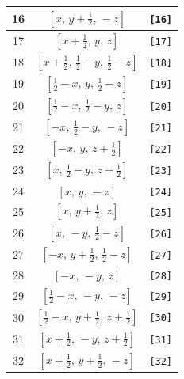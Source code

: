 \documentclass[fleqn,8pt]{jsarticle}
\begin{document}
\begin{longtable}{ccc}
16 & $\left[ x,\, y + \frac{1}{2},\, - z \right]$ & {\tt [16]} \\ \hline
17 & $\left[ x + \frac{1}{2},\, y,\, z \right]$ & {\tt [17]} \\ \hline
18 & $\left[ x + \frac{1}{2},\, \frac{1}{2} - y,\, \frac{1}{2} - z \right]$ & {\tt [18]} \\ \hline
19 & $\left[ \frac{1}{2} - x,\, y,\, \frac{1}{2} - z \right]$ & {\tt [19]} \\ \hline
20 & $\left[ \frac{1}{2} - x,\, \frac{1}{2} - y,\, z \right]$ & {\tt [20]} \\ \hline
21 & $\left[ - x,\, \frac{1}{2} - y,\, - z \right]$ & {\tt [21]} \\ \hline
22 & $\left[ - x,\, y,\, z + \frac{1}{2} \right]$ & {\tt [22]} \\ \hline
23 & $\left[ x,\, \frac{1}{2} - y,\, z + \frac{1}{2} \right]$ & {\tt [23]} \\ \hline
24 & $\left[ x,\, y,\, - z \right]$ & {\tt [24]} \\ \hline
25 & $\left[ x,\, y + \frac{1}{2},\, z \right]$ & {\tt [25]} \\ \hline
26 & $\left[ x,\, - y,\, \frac{1}{2} - z \right]$ & {\tt [26]} \\ \hline
27 & $\left[ - x,\, y + \frac{1}{2},\, \frac{1}{2} - z \right]$ & {\tt [27]} \\ \hline
28 & $\left[ - x,\, - y,\, z \right]$ & {\tt [28]} \\ \hline
29 & $\left[ \frac{1}{2} - x,\, - y,\, - z \right]$ & {\tt [29]} \\ \hline
30 & $\left[ \frac{1}{2} - x,\, y + \frac{1}{2},\, z + \frac{1}{2} \right]$ & {\tt [30]} \\ \hline
31 & $\left[ x + \frac{1}{2},\, - y,\, z + \frac{1}{2} \right]$ & {\tt [31]} \\ \hline
32 & $\left[ x + \frac{1}{2},\, y + \frac{1}{2},\, - z \right]$ & {\tt [32]} \\
\end{longtable}
\end{document}
